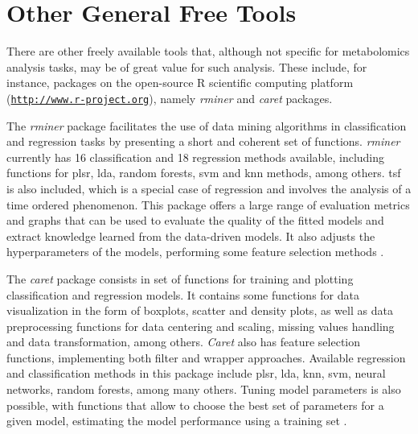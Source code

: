 \section{Other General Free Tools}

There are other freely available tools that, although not specific for metabolomics analysis tasks, may be of great value for such analysis. These include, for instance, packages on the open-source R scientific computing platform (\href{http://www.r-project.org}{\nolinkurl{http://www.r-project.org}}), namely \textit{rminer} and \textit{caret} packages.

The \textit{rminer} package facilitates the use of data mining algorithms in classification and regression tasks by presenting a short and coherent set of functions. \textit{rminer} currently has 16 classification and 18 regression methods available, including functions for \gls{plsr}, \gls{lda}, random forests, \gls{svm} and \gls{knn} methods, among others. \gls{tsf} is also included, which is a special case of regression and involves the analysis of a time ordered phenomenon. This package offers a large range of evaluation metrics and graphs that can be used to evaluate the quality of the fitted models and extract knowledge learned from the data-driven models. It also adjusts the hyperparameters of the models, performing some feature selection methods \citep{rminer}. 

The \textit{caret} package consists in set of functions for training and plotting classification and regression models. It contains some functions for data visualization in the form of boxplots, scatter and density plots, as well as data preprocessing functions for data centering and scaling, missing values handling and data transformation, among others. \textit{Caret} also has feature selection functions, implementing both filter and wrapper approaches. Available regression and classification methods in this package include \gls{plsr}, \gls{lda}, \gls{knn}, \gls{svm}, neural networks, random forests, among many others. Tuning model parameters is also possible, with functions that allow to choose the best set of parameters for a given model, estimating the model performance using a training set \citep{caret}.






